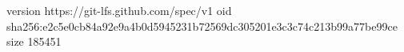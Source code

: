 version https://git-lfs.github.com/spec/v1
oid sha256:e2c5e0cb84a92e9a4b0d5945231b72569dc305201e3c3c74c213b99a77be99ce
size 185451
